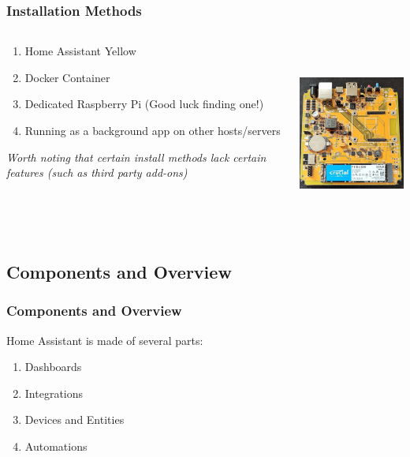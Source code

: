 \documentclass[aspectratio=169]{beamer}
\begin{document}
\begin{frame}[fragile]
  \frametitle{Installation Methods}
  \begin{columns}[]
    \begin{column}[T]{0.45\paperwidth}
      \begin{enumerate}%
        \item{Home Assistant Yellow}
        \item{Docker Container}
        \item{Dedicated Raspberry Pi \tiny{(Good luck finding one!)}}
        \item{Running as a background app on other hosts/servers}
      \end{enumerate}
      \emph{Worth noting that certain install methods lack certain features (such as third party add-ons)}
    \end{column}
    \begin{column}[T]{0.45\paperwidth}
      \includegraphics[height=6cm,keepaspectratio]{images/yellow.jpg}
    \end{column}
  \end{columns}
\end{frame}

\subsection{Components and Overview}
\begin{frame}[fragile]
  \frametitle{Components and Overview}
  Home Assistant is made of several parts:
  \begin{enumerate}%
    \item{Dashboards}
    \item{Integrations}
    \item{Devices and Entities}
    \item{Automations}
  \end{enumerate}
\end{frame}
\end{document}
